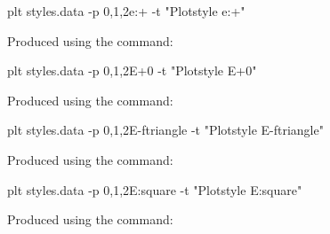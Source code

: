 \documentclass{book}
\begin{document}
\begin{figure}
\begin{center}
\end{center}
\caption[Plotstyle e:+]{Produced using the command:
\label{fig:style-e:+}}
\begin{center}
\begin{boxedverbatim}
plt styles.data -p 0,1,2e:+ -t "Plotstyle e:+"
\end{boxedverbatim}
\end{center}
\end{figure}

\begin{figure}
\begin{center}
\end{center}
\caption[Plotstyle E+0]{Produced using the command:
\label{fig:style-E+0}}
\begin{center}
\begin{boxedverbatim}
plt styles.data -p 0,1,2E+0 -t "Plotstyle E+0"
\end{boxedverbatim}
\end{center}
\end{figure}

\begin{figure}
\begin{center}
\end{center}
\caption[Plotstyle E-ftriangle]{Produced using the command:
\label{fig:style-E-ftriangle}}
\begin{center}
\begin{boxedverbatim}
plt styles.data -p 0,1,2E-ftriangle -t "Plotstyle E-ftriangle"
\end{boxedverbatim}
\end{center}
\end{figure}

\begin{figure}
\begin{center}
\end{center}
\caption[Plotstyle E:square]{Produced using the command:
\label{fig:style-E:square}}
\begin{center}
\begin{boxedverbatim}
plt styles.data -p 0,1,2E:square -t "Plotstyle E:square"
\end{boxedverbatim}
\end{center}
\end{figure}
\end{document}
